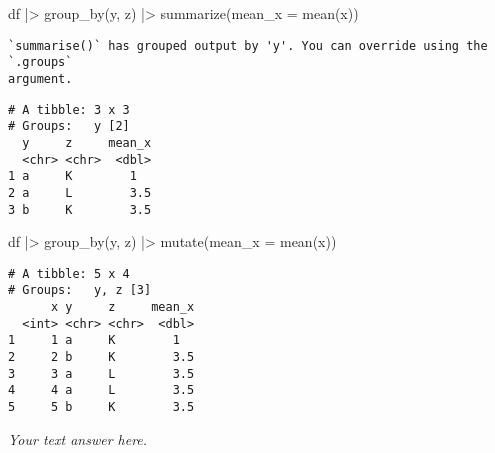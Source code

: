 \documentclass[
  letterpaper,
  DIV=11,
  numbers=noendperiod]{scrreprt}
\newenvironment{Shaded}{\begin{snugshade}}{\end{snugshade}}
\newcommand{\AttributeTok}[1]{\textcolor[rgb]{0.40,0.45,0.13}{#1}}
\newcommand{\FunctionTok}[1]{\textcolor[rgb]{0.28,0.35,0.67}{#1}}
\newcommand{\NormalTok}[1]{\textcolor[rgb]{0.00,0.23,0.31}{#1}}
\newcommand{\SpecialCharTok}[1]{\textcolor[rgb]{0.37,0.37,0.37}{#1}}
\begin{document}
\begin{enumerate}
  \begin{tcolorbox}[enhanced jigsaw, left=2mm, rightrule=.15mm, bottomtitle=1mm, opacitybacktitle=0.6, leftrule=.75mm, opacityback=0, colframe=quarto-callout-note-color-frame, bottomrule=.15mm, coltitle=black, toptitle=1mm, colback=white, titlerule=0mm, colbacktitle=quarto-callout-note-color!10!white, title={Answer}, toprule=.15mm, breakable, arc=.35mm]

\begin{Shaded}
\begin{Highlighting}[]
\NormalTok{df }\SpecialCharTok{|\textgreater{}}
  \FunctionTok{group\_by}\NormalTok{(y, z) }\SpecialCharTok{|\textgreater{}}
  \FunctionTok{summarize}\NormalTok{(}\AttributeTok{mean\_x =} \FunctionTok{mean}\NormalTok{(x))}
\end{Highlighting}
\end{Shaded}

\begin{verbatim}
`summarise()` has grouped output by 'y'. You can override using the `.groups`
argument.
\end{verbatim}

\begin{verbatim}
# A tibble: 3 x 3
# Groups:   y [2]
  y     z     mean_x
  <chr> <chr>  <dbl>
1 a     K        1  
2 a     L        3.5
3 b     K        3.5
\end{verbatim}

\begin{Shaded}
\begin{Highlighting}[]
\NormalTok{df }\SpecialCharTok{|\textgreater{}}
  \FunctionTok{group\_by}\NormalTok{(y, z) }\SpecialCharTok{|\textgreater{}}
  \FunctionTok{mutate}\NormalTok{(}\AttributeTok{mean\_x =} \FunctionTok{mean}\NormalTok{(x))}
\end{Highlighting}
\end{Shaded}

\begin{verbatim}
# A tibble: 5 x 4
# Groups:   y, z [3]
      x y     z     mean_x
  <int> <chr> <chr>  <dbl>
1     1 a     K        1  
2     2 b     K        3.5
3     3 a     L        3.5
4     4 a     L        3.5
5     5 b     K        3.5
\end{verbatim}

  \emph{Your text answer here.}

  \end{tcolorbox}
\end{enumerate}

\end{document}
